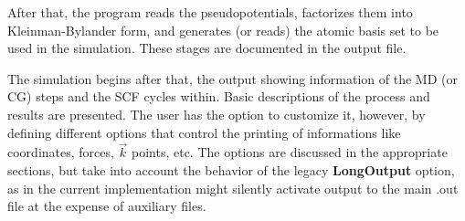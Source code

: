 \documentclass[11pt]{article}
\begin{document}
After that, the program reads the pseudopotentials, factorizes them
into Kleinman-Bylander form, and generates (or reads) the atomic basis
set to be used in the simulation. These stages are documented in the
output file.

The simulation begins after that, the output showing information of
the MD (or CG) steps and the SCF cycles within.  Basic descriptions of
the process and results are presented. The user has the option to
customize it, however, by defining
different options that control the printing of informations like
coordinates, forces, $\vec k$ points, etc.  The options are discussed
in the appropriate sections, but take into account the behavior of the
legacy {\bf LongOutput} option, as in the current implementation might
silently activate output to the main .out file at the expense of
auxiliary files.
\end{document}

